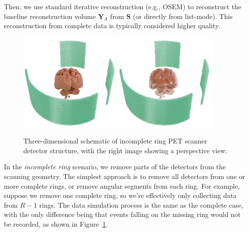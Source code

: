 \documentclass[
reprint,
superscriptaddress,
nofootinbib,
amsmath,amssymb,
aps,
prd,
]{revtex4-2}
\begin{document}
Then, we use standard iterative reconstruction (e.g., OSEM) to reconstruct the baseline reconstruction volume \(\mathbf{Y}_A\) from \(\mathbf{S}\) (or directly from list-mode). This reconstruction from complete data is typically considered higher quality.
\begin{figure}[htbp]
    \centering
    \vspace{-0.2cm}
    \includegraphics[width=0.45\textwidth]{Images/Thehumanbrainismissing5}
    \includegraphics[width=0.45\textwidth]{Images/Thehumanbrainismissing4}
    \vspace{-0.2cm}
    \caption{Three-dimensional schematic of incomplete ring PET scanner detector structure, with the right image showing a perspective view.}
    \vspace{-0.2cm}
    \label{fig:pet_structures2}
\end{figure}
In the \emph{incomplete ring} scenario, we remove parts of the detectors from the scanning geometry. The simplest approach is to remove all detectors from one or more complete rings, or remove angular segments from each ring. For example, suppose we remove one complete ring, so we're effectively only collecting data from \(R-1\) rings. The data simulation process is the same as the complete case, with the only difference being that events falling on the missing ring would not be recorded, as shown in Figure~\ref{fig:pet_structures2}.
\end{document}
